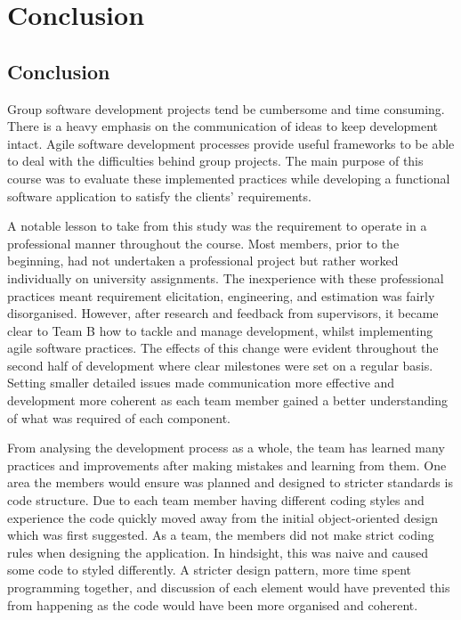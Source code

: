 \documentclass{l3proj}
\begin{document}
\section{Conclusion}
\label{sec:conclusion}
\subsection{Conclusion}
Group software development projects tend be cumbersome and time consuming. There is a heavy emphasis on the communication of ideas to keep development intact. Agile software development processes provide useful frameworks to be able to deal with the difficulties behind group projects. The main purpose of this course was to evaluate these implemented practices while developing a functional software application to satisfy the clients' requirements.

A notable lesson to take from this study was the requirement to operate in a professional manner throughout the course. Most members, prior to the beginning, had not undertaken a professional project but rather worked individually on university assignments. The inexperience with these professional practices meant requirement elicitation, engineering, and estimation was fairly disorganised. However, after research and feedback from supervisors, it became clear to Team B how to tackle and manage development, whilst implementing agile software practices. The effects of this change were evident throughout the second half of development where clear milestones were set on a regular basis. Setting smaller detailed issues made communication more effective and development more coherent as each team member gained a better understanding of what was required of each component.

From analysing the development process as a whole, the team has learned many practices and improvements after making mistakes and learning from them. One area the members would ensure was planned and designed to stricter standards is code structure. Due to each team member having different coding styles and experience the code quickly moved away from the initial object-oriented design which was first suggested. As a team, the members did not make strict coding rules when designing the application. In hindsight, this was naive and caused some code to styled differently. A stricter design pattern, more time spent programming together, and discussion of each element would have prevented this from happening as the code would have been more organised and coherent.
\end{document}
